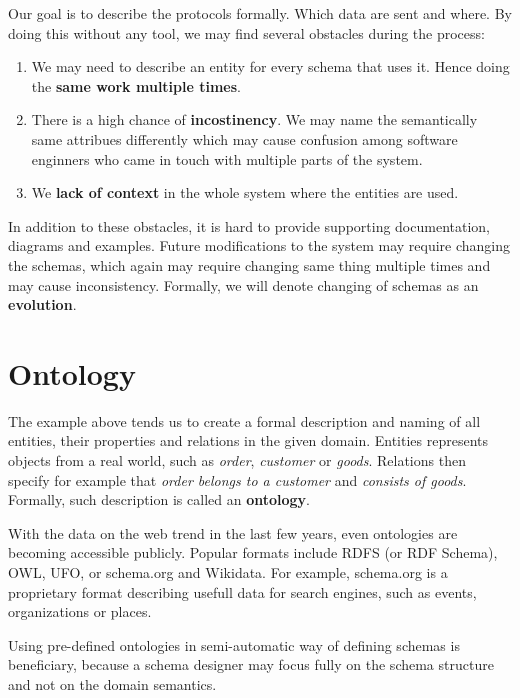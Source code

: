 Our goal is to describe the protocols formally. Which data are sent and where. By doing this without any tool, we may find several obstacles during the process:

\begin{enumerate}
    \item We may need to describe an entity for every schema that uses it. Hence doing the \textbf{same work multiple times}.
    \item There is a high chance of \textbf{incostinency}. We may name the semantically same attribues differently which may cause confusion among software enginners who came in touch with multiple parts of the system.
    \item We \textbf{lack of context} in the whole system where the entities are used.
\end{enumerate}

In addition to these obstacles, it is hard to provide supporting documentation, diagrams and examples. Future modifications to the system may require changing the schemas, which again may require changing same thing multiple times and may cause inconsistency. Formally, we will denote changing of schemas as an \textbf{evolution}.

\section*{Ontology}

The example above tends us to create a formal description and naming of all entities, their properties and relations in the given domain. Entities represents objects from a real world, such as \textit{order}, \textit{customer} or \textit{goods}. Relations then specify for example that \textit{order belongs to a customer} and \textit{consists of goods}. Formally, such description is called an \textbf{ontology}.

With the data on the web \cite{data-on-the-web} trend in the last few years, even ontologies are becoming accessible publicly. Popular formats include RDFS (or RDF Schema), OWL, UFO, or schema.org and Wikidata. For example, schema.org is a proprietary format describing usefull data for search engines, such as events, organizations or places.

Using pre-defined ontologies in semi-automatic way of defining schemas is beneficiary, because a schema designer may focus fully on the schema structure and not on the domain semantics.

